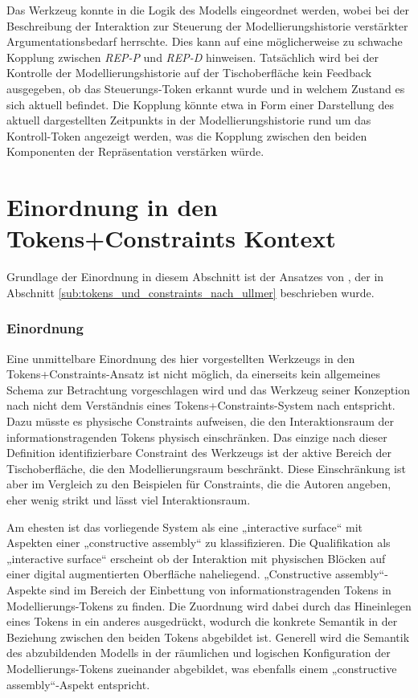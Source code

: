 Das Werkzeug konnte in die Logik des Modells eingeordnet werden, wobei bei der Beschreibung der Interaktion zur Steuerung der Modellierungshistorie verstärkter Argumentationsbedarf herrschte. Dies kann auf eine möglicherweise zu schwache Kopplung zwischen \emph{REP-P} und \emph{REP-D} hinweisen. Tatsächlich wird bei der Kontrolle der Modellierungshistorie auf der Tischoberfläche kein Feedback ausgegeben, ob das Steuerungs-Token erkannt wurde und in welchem Zustand es sich aktuell befindet. Die Kopplung könnte etwa in Form einer Darstellung des aktuell dargestellten Zeitpunkts in der Modellierungshistorie rund um das Kontroll-Token angezeigt werden, was die Kopplung zwischen den beiden Komponenten der Repräsentation verstärken würde.


\section{Einordnung in den Tokens+Constraints Kontext} %
\label{sec:einordnung_in_den_tokens_constraints_kontext}

Grundlage der Einordnung in diesem Abschnitt ist der Ansatzes von \citep{Ullmer05}, der in Abschnitt \ref{sub:tokens_und_constraints_nach_ullmer} beschrieben wurde.

\subsubsection{Einordnung}

Eine unmittelbare Einordnung des hier vorgestellten Werkzeugs in den Tokens+Constraints-Ansatz ist nicht möglich, da einerseits kein allgemeines Schema zur Betrachtung vorgeschlagen wird und das Werkzeug seiner Konzeption nach nicht dem Verständnis eines Tokens+Constraints-System nach \citep{Ullmer05} entspricht. Dazu müsste es physische Constraints aufweisen, die den Interaktionsraum der informationstragenden Tokens physisch einschränken. Das einzige nach dieser Definition identifizierbare Constraint des Werkzeugs ist der aktive Bereich der Tischoberfläche, die den Modellierungsraum beschränkt. Diese Einschränkung ist aber im Vergleich zu den Beispielen für Constraints, die die Autoren angeben, eher wenig strikt und lässt viel Interaktionsraum.

Am ehesten ist das vorliegende System als eine „interactive surface“ mit Aspekten einer „constructive assembly“ zu klassifizieren. Die Qualifikation als „interactive surface“ erscheint ob der Interaktion mit physischen Blöcken auf einer digital augmentierten Oberfläche naheliegend. „Constructive assembly“-Aspekte sind im Bereich der Einbettung von informationstragenden Tokens in Modellierungs-Tokens zu finden. Die Zuordnung wird dabei durch das Hineinlegen eines Tokens in ein anderes ausgedrückt, wodurch die konkrete Semantik in der Beziehung zwischen den beiden Tokens abgebildet ist. Generell wird die Semantik des abzubildenden Modells in der räumlichen und logischen Konfiguration der Modellierungs-Tokens zueinander abgebildet, was ebenfalls einem „constructive assembly“-Aspekt entspricht.

